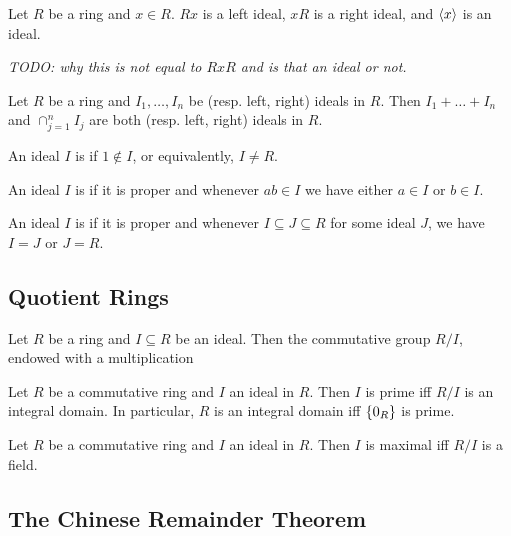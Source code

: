 \documentclass{styles/tufte}
\begin{document}
\begin{example}{}{}
  Let $R$ be a ring and $x \in R$. $Rx$ is a left ideal, $xR$ is a right ideal, and $\langle x \rangle$ is an ideal.
  
  \em{TODO:} why this is not equal to $RxR$ and is that an ideal or not.
\end{example}

\begin{example}{}{}
  Let $R$ be a ring and $I_1, \dots, I_n$ be (resp. left, right) ideals in $R$. Then $I_1 + \dots + I_n$ and $\cap_{j=1}^n I_j$ are both (resp. left, right) ideals in $R$.
\end{example}

\begin{definition}{}{}
  An ideal $I$ is  if $1 \notin I$, or equivalently, $I \neq R$.
  
  An ideal $I$ is  if it is proper and whenever $ab \in I$ we have either $a \in I$ or $b \in I$.
  
  An ideal $I$ is  if it is proper and whenever $I \subseteq J \subseteq R$ for some ideal $J$, we have $I = J$ or $J = R$.
\end{definition}


\subsection{Quotient Rings}
  
  \begin{theorem}{}{}
    Let $R$ be a ring and $I \subseteq R$ be an ideal. Then the commutative group $R/I$, endowed with a multiplication
  \end{theorem}
  
  \begin{proposition}{}{}
    Let $R$ be a commutative ring and $I$ an ideal in $R$. Then $I$ is prime iff $R/I$ is an integral domain. In particular, $R$ is an integral domain iff $\set{0_R}$ is prime.
  \end{proposition}
  
  \begin{proposition}{}{}
    Let $R$ be a commutative ring and $I$ an ideal in $R$. Then $I$ is maximal iff $R/I$ is a field.
  \end{proposition}


\subsection{The Chinese Remainder Theorem}
\end{document}
